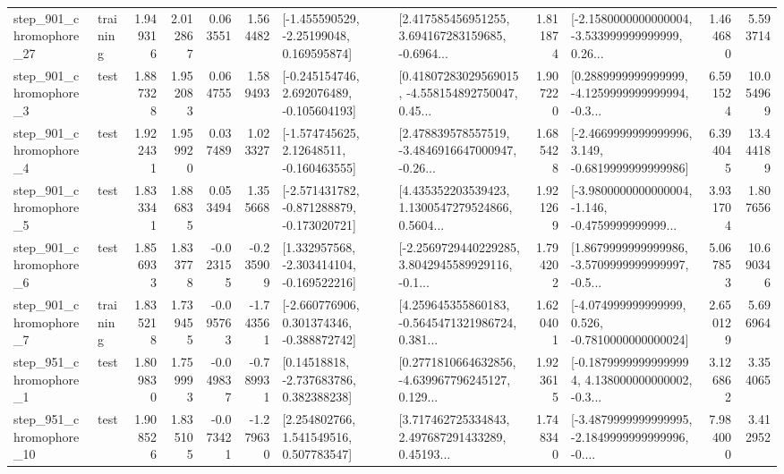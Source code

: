 \begin{tabular}{llrrrrllrlrr}
  step\_901\_chromophore\_27 &  training &      1.949316 &    2.012867 &      0.063551 &  1.564482 &    [-1.455590529, -2.25199048, 0.169595874] &  [2.417585456951255, 3.694167283159685, -0.6964... &       1.811874 &  [-2.1580000000000004, -3.533999999999999, 0.26... &            1.464680 &          5.593714 \\
   step\_901\_chromophore\_3 &      test &      1.887328 &    1.952083 &      0.064755 &  1.589493 &   [-0.245154746, 2.692076489, -0.105604193] &  [0.41807283029569015, -4.558154892750047, 0.45... &       1.907220 &  [0.2889999999999999, -4.1259999999999994, -0.3... &            6.591524 &         10.054969 \\
   step\_901\_chromophore\_4 &      test &      1.922431 &    1.959920 &      0.037489 &  1.023327 &    [-1.574745625, 2.12648511, -0.160463555] &  [2.478839578557519, -3.4846916647000947, -0.26... &       1.685428 &  [-2.4669999999999996, 3.149, -0.6819999999999986] &            6.394045 &         13.444189 \\
   step\_901\_chromophore\_5 &      test &      1.833341 &    1.886835 &      0.053494 &  1.355668 &  [-2.571431782, -0.871288879, -0.173020721] &  [4.435352203539423, 1.1300547279524866, 0.5604... &       1.921269 &  [-3.9800000000000004, -1.146, -0.4759999999999... &            3.931704 &          1.807656 \\
   step\_901\_chromophore\_6 &      test &      1.856933 &    1.833778 &     -0.023155 & -0.235909 &   [1.332957568, -2.303414104, -0.169522216] &  [-2.2569729440229285, 3.8042945589929116, -0.1... &       1.794202 &  [1.8679999999999986, -3.5709999999999997, -0.5... &            5.067853 &         10.690346 \\
   step\_901\_chromophore\_7 &  training &      1.835218 &    1.739455 &     -0.095763 & -1.743561 &   [-2.660776906, 0.301374346, -0.388872742] &  [4.259645355860183, -0.5645471321986724, 0.381... &       1.620401 &   [-4.074999999999999, 0.526, -0.7810000000000024] &            2.650129 &          5.696964 \\
   step\_951\_chromophore\_1 &      test &      1.809830 &    1.759993 &     -0.049837 & -0.789931 &     [0.14518818, -2.737683786, 0.382388238] &  [0.2771810664632856, -4.639967796245127, 0.129... &       1.923615 &  [-0.18799999999999994, 4.138000000000002, -0.3... &            3.126862 &          3.354065 \\
  step\_951\_chromophore\_10 &      test &      1.908526 &    1.835105 &     -0.073421 & -1.279630 &     [2.254802766, 1.541549516, 0.507783547] &  [3.717462725334843, 2.497687291433289, 0.45193... &       1.748340 &  [-3.4879999999999995, -2.1849999999999996, -0.... &            7.984000 &          3.412952 \\

\end{tabular}
